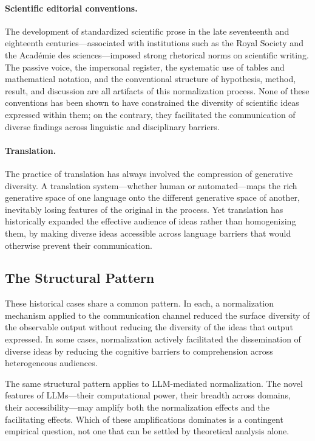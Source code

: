 \documentclass[12pt,a4paper]{article}
\theoremstyle{definition}
\theoremstyle{plain}
\theoremstyle{remark}
\begin{document}
\paragraph{Scientific editorial conventions.} The development of standardized scientific
prose in the late seventeenth and eighteenth centuries---associated with institutions such as
the Royal Society and the Acad\'emie des sciences---imposed strong rhetorical norms on
scientific writing. The passive voice, the impersonal register, the systematic use of
tables and mathematical notation, and the conventional structure of hypothesis, method,
result, and discussion are all artifacts of this normalization process. None of these
conventions has been shown to have constrained the diversity of scientific ideas expressed
within them; on the contrary, they facilitated the communication of diverse findings across
linguistic and disciplinary barriers.

\paragraph{Translation.} The practice of translation has always involved the compression of
generative diversity. A translation system---whether human or automated---maps the rich
generative space of one language onto the different generative space of another, inevitably
losing features of the original in the process. Yet translation has historically expanded the
effective audience of ideas rather than homogenizing them, by making diverse ideas accessible
across language barriers that would otherwise prevent their communication.

\subsection{The Structural Pattern}

These historical cases share a common pattern. In each, a normalization mechanism applied to
the communication channel reduced the surface diversity of the observable output without
reducing the diversity of the ideas that output expressed. In some cases, normalization
actively facilitated the dissemination of diverse ideas by reducing the cognitive barriers
to comprehension across heterogeneous audiences.

The same structural pattern applies to LLM-mediated normalization. The novel features of
LLMs---their computational power, their breadth across domains, their accessibility---may
amplify both the normalization effects and the facilitating effects. Which of these
amplifications dominates is a contingent empirical question, not one that can be settled by
theoretical analysis alone.
\end{document}
